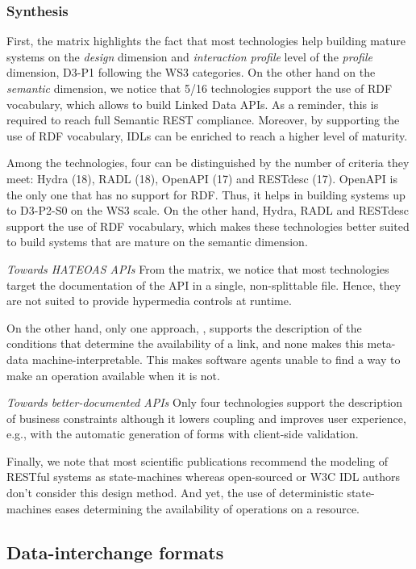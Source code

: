 \subsubsection*{Synthesis}

First, the matrix highlights the fact that most technologies help building mature systems on the \textit{design} dimension and \textit{interaction profile} level of the \textit{profile} dimension, D3-P1 following the WS3 categories.
On the other hand on the \textit{semantic} dimension, we notice that 5/16 technologies support the use of RDF vocabulary, which allows to build Linked Data APIs. As a reminder, this is required to reach full Semantic REST compliance.
Moreover, by supporting the use of RDF vocabulary, IDLs can be enriched to reach a higher level of maturity.

Among the technologies, four can be distinguished by the number of criteria they meet: Hydra (18), RADL (18), OpenAPI (17) and RESTdesc (17).
OpenAPI is the only one that has no support for RDF. Thus, it helps in building systems up to D3-P2-S0 on the WS3 scale.
On the other hand, Hydra, RADL and RESTdesc support the use of RDF vocabulary, which makes these technologies better suited to build systems that are mature on the semantic dimension.

\textit{Towards HATEOAS APIs}
From the matrix, we notice that most technologies target the documentation of the API in a single, non-splittable file. Hence, they are not suited to provide hypermedia controls at runtime.

On the other hand, only one approach, \cite{Schreier:2011:MRA:1967428.1967434}, supports the description of the conditions that determine the availability of a link, and none makes this meta-data machine-interpretable. This makes software agents unable to find a way to make an operation available when it is not.

\textit{Towards better-documented APIs}
Only four technologies support the description of business constraints although it lowers coupling and improves user experience, e.g., with the automatic generation of forms with client-side validation.

Finally, we note that most scientific publications recommend the modeling of RESTful systems as state-machines whereas open-sourced or W3C IDL authors don't consider this design method. And yet, the use of deterministic state-machines eases determining the availability of operations on a resource.

\subsection{Data-interchange formats}

